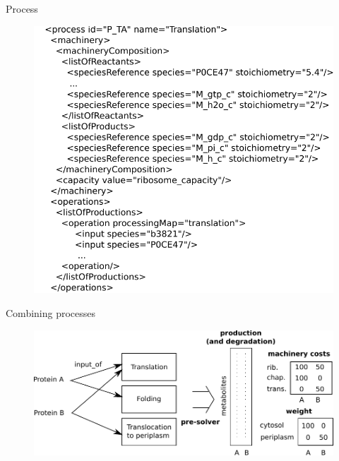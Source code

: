 \documentclass{beamer}
\begin{document}
\begin{frame}{Process}
  \begin{figure}
    \centering
    \includegraphics[scale=0.7]{process}
  \end{figure}
\end{frame}

\begin{frame}{Combining processes}
  \begin{figure}
    \centering
    \includegraphics[width=\linewidth]{combining_processes}
  \end{figure}
\end{frame}
\end{document}
